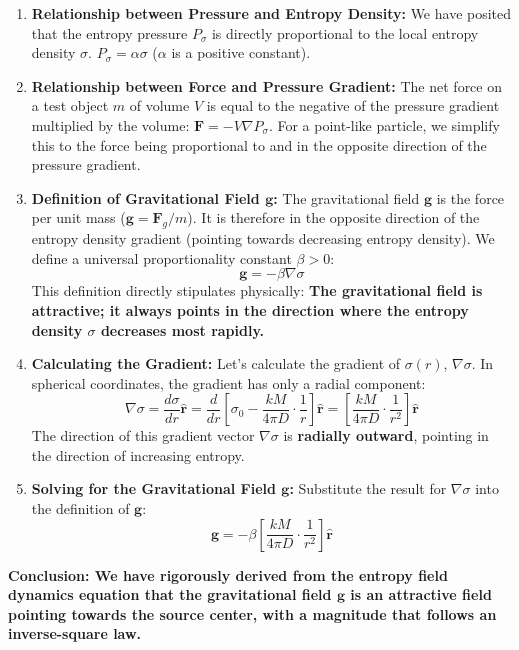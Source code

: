 \documentclass[11pt, a4paper]{article}
\begin{document}
\begin{enumerate}
    \item \textbf{Relationship between Pressure and Entropy Density:} We have posited that the entropy pressure $P_\sigma$ is directly proportional to the local entropy density $\sigma$. $P_\sigma = \alpha \sigma$ ($\alpha$ is a positive constant).
    \item \textbf{Relationship between Force and Pressure Gradient:} The net force on a test object $m$ of volume $V$ is equal to the negative of the pressure gradient multiplied by the volume: $\mathbf{F} = -V \nabla P_\sigma$. For a point-like particle, we simplify this to the force being proportional to and in the opposite direction of the pressure gradient.
    \item \textbf{Definition of Gravitational Field $\mathbf{g}$:} The gravitational field $\mathbf{g}$ is the force per unit mass ($\mathbf{g} = \mathbf{F}_g/m$). It is therefore in the opposite direction of the entropy density gradient (pointing towards decreasing entropy density). We define a universal proportionality constant $\beta > 0$:
    \[
    \mathbf{g} = -\beta \nabla\sigma
    \]
    This definition directly stipulates physically: \textbf{The gravitational field is attractive; it always points in the direction where the entropy density $\sigma$ decreases most rapidly.}

    \item \textbf{Calculating the Gradient:} Let's calculate the gradient of $\sigma(r)$, $\nabla\sigma$. In spherical coordinates, the gradient has only a radial component:
    \[
    \nabla\sigma = \frac{d\sigma}{dr} \hat{\mathbf{r}} = \frac{d}{dr} \left[\sigma_0 - \frac{kM}{4\pi D} \cdot \frac{1}{r}\right] \hat{\mathbf{r}} = \left[ \frac{kM}{4\pi D} \cdot \frac{1}{r^2} \right] \hat{\mathbf{r}}
    \]
    The direction of this gradient vector $\nabla\sigma$ is \textbf{radially outward}, pointing in the direction of increasing entropy.

    \item \textbf{Solving for the Gravitational Field $\mathbf{g}$:} Substitute the result for $\nabla\sigma$ into the definition of $\mathbf{g}$:
    \[
    \mathbf{g} = -\beta \left[ \frac{kM}{4\pi D} \cdot \frac{1}{r^2} \right] \hat{\mathbf{r}}
    \]
\end{enumerate}

\textbf{Conclusion: We have rigorously derived from the entropy field dynamics equation that the gravitational field $\mathbf{g}$ is an attractive field pointing towards the source center, with a magnitude that follows an inverse-square law.}
\end{document}
